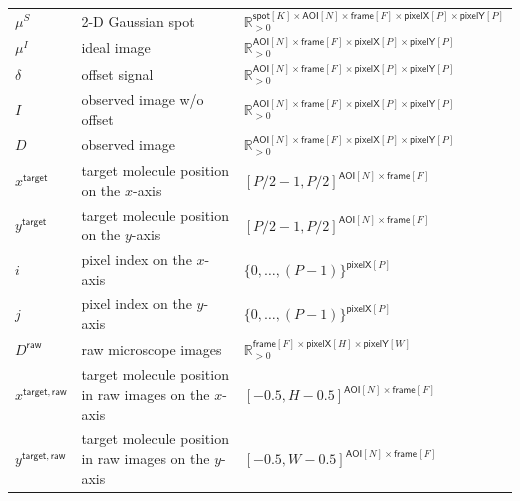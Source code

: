 \begin{table}[h]
\begin{tabular}{l l l}
$\mu^S$ & 2-D Gaussian spot & $\mathbb{R}_{>0}^{\mathsf{spot}[K] \times \mathsf{AOI}[N] \times \mathsf{frame}[F] \times \mathsf{pixelX}[P] \times \mathsf{pixelY}[P]}$ \rule{0pt}{3ex} \\
$\mu^I$ & ideal image & $\mathbb{R}_{>0}^{\mathsf{AOI}[N] \times \mathsf{frame}[F] \times \mathsf{pixelX}[P] \times \mathsf{pixelY}[P]}$ \rule{0pt}{3ex} \\
$\delta$ & offset signal & $\mathbb{R}_{>0}^{\mathsf{AOI}[N] \times \mathsf{frame}[F] \times \mathsf{pixelX}[P] \times \mathsf{pixelY}[P]}$ \rule{0pt}{3ex} \\
$I$ & observed image w/o offset & $\mathbb{R}_{>0}^{\mathsf{AOI}[N] \times \mathsf{frame}[F] \times \mathsf{pixelX}[P] \times \mathsf{pixelY}[P]}$ \rule{0pt}{3ex} \\
$D$ & observed image & $\mathbb{R}_{>0}^{\mathsf{AOI}[N] \times \mathsf{frame}[F] \times \mathsf{pixelX}[P] \times \mathsf{pixelY}[P]}$ \rule{0pt}{3ex} \\
$x^\mathsf{target}$ & target molecule position on the $x$-axis & $[P/2-1, P/2]^{\mathsf{AOI}[N] \times \mathsf{frame}[F]}$ \rule{0pt}{3ex} \\
$y^\mathsf{target}$ & target molecule position on the $y$-axis & $[P/2-1, P/2]^{\mathsf{AOI}[N] \times \mathsf{frame}[F]}$ \rule{0pt}{3ex} \\
$i$ & pixel index on the $x$-axis & $\{0, \dots, (P-1)\}^{\mathsf{pixelX}[P]}$ \rule{0pt}{3ex} \\
$j$ & pixel index on the $y$-axis & $\{0, \dots, (P-1)\}^{\mathsf{pixelX}[P]}$ \rule{0pt}{3ex} \\
$D^\mathsf{raw}$ & raw microscope images & $\mathbb{R}_{>0}^{\mathsf{frame}[F] \times \mathsf{pixelX}[H] \times \mathsf{pixelY}[W]}$ \rule{0pt}{3ex} \\
$x^{\mathsf{target}, \mathsf{raw}}$ & target molecule position in raw images on the $x$-axis & $[-0.5, H-0.5]^{\mathsf{AOI}[N] \times \mathsf{frame}[F]}$ \rule{0pt}{3ex} \\
$y^{\mathsf{target}, \mathsf{raw}}$ & target molecule position in raw images on the $y$-axis & $[-0.5, W-0.5]^{\mathsf{AOI}[N] \times \mathsf{frame}[F]}$ \rule{0pt}{3ex} \\
\bottomrule
\end{tabular}
\end{table}
\clearpage
\pagebreak

